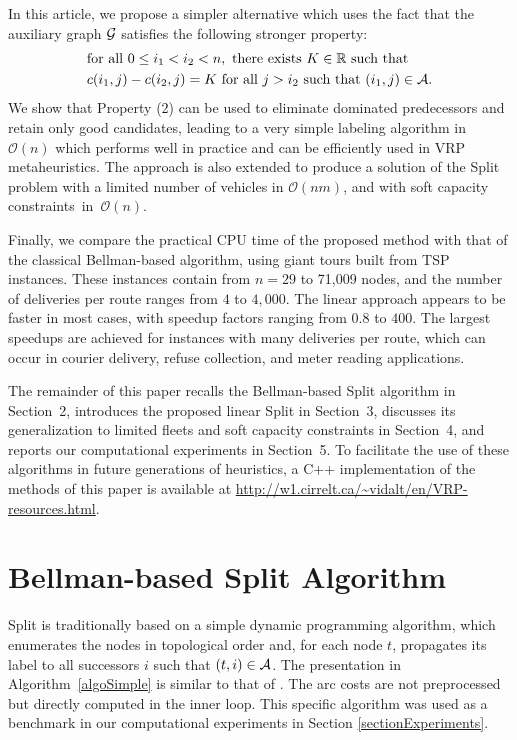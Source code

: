 \documentclass[11pt]{article}
\newcommand{\cO}{{\mathcal O}}
\newcommand{\cA}{{\cal A}}
\newcommand{\cG}{{\cal G}}
\begin{document}
In this article, we propose a simpler alternative which uses the fact that the auxiliary graph $\cG$ satisfies the following stronger property:
\begin{equation}
\begin{aligned}
&\text{for all } 0 \leq i_1 < i_2 < n, \text{ there exists } K  \in \mathbb{R} \text{ such that } \\
 &c(i_1,j) - c(i_2,j) = K \   \text{for all }   j  > i_2 \text{ such that } (i_1,j) \in \cA.
\end{aligned} \label{eqequa}
\end{equation}
We show that Property (2) can be used to eliminate dominated predecessors and retain only good candidates, leading to a very simple labeling algorithm in $\cO(n)$ which performs well in practice and can be efficiently used in VRP metaheuristics.
The approach is also extended to produce a solution of the Split problem with a limited number of vehicles in $\cO(nm)$, and with soft capacity constraints~in~$\cO(n)$. 

Finally, we compare the practical CPU time of the proposed method with that of the classical Bellman-based algorithm, using giant tours built from TSP instances. These instances contain from $n=29$ to 71,009 nodes, and the number of deliveries per route ranges from $4$ to $4,000$.  The linear approach appears to be faster in most cases, with speedup factors ranging from $0.8$ to $400$. The largest speedups are achieved for instances with many deliveries per route, which can occur in courier delivery, refuse collection, and meter reading applications.

The remainder of this paper recalls the Bellman-based Split algorithm in Section~2, introduces the proposed linear Split in Section~3, discusses its generalization to limited fleets and soft capacity constraints in Section~4, and reports our computational experiments in Section~5. To facilitate the use of these algorithms in future generations of heuristics, a C++ implementation of the methods of this paper is available at \url{http://w1.cirrelt.ca/\~vidalt/en/VRP-resources.html}. 

\section{Bellman-based Split Algorithm}
\label{sectionBellman}

Split is traditionally based on a simple dynamic programming algorithm, which enumerates the nodes in topological order and, for each node $t$, propagates its label to all successors $i$ such that $(t,i) \in \cA$. The presentation in Algorithm~\ref{algoSimple} is similar to that of \cite{Prins2004}. The arc costs are not preprocessed but directly computed in the inner loop. This specific algorithm was used as a benchmark in our computational experiments in Section \ref{sectionExperiments}.
\end{document}
